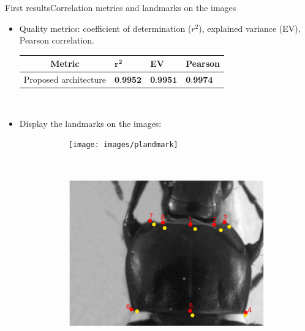 \documentclass[10pt,svgnames]{beamer}
\begin{document}
\begin{frame}{First results}{Correlation metrics and landmarks on the images}
	\begin{itemize}
		\item Quality metrics: coefficient of determination ($r^2$), explained variance (EV), Pearson correlation.
			\begin{table}[htbp]
				\centering
				\begin{tabular}{|c|p{1cm}|p{1cm}|p{1.5cm}|}
					\hline
					Metric & $\mathbf{r^{2}}$ & \textbf{EV} & \textbf{Pearson} \\ \hline
					Proposed architecture & $\textbf{0.9952}$ & $\textbf{0.9951}$ & $\textbf{0.9974}$ \\ \hline
				\end{tabular}
			\end{table}~\\
	\pause
	\item Display the landmarks on the images:
	\begin{figure}[htbp]
   				\begin{subfigure}[t]{0.5\textwidth}
        			\centering
        			\texttt{[image: images/plandmark]}
        			\caption{ }
        			\label{figsub11}
    			\end{subfigure}%
    			~ 
    			\begin{subfigure}[t]{0.5\textwidth}
        			\centering
        			\includegraphics[scale=.2]{images/plandmark2}
        			\caption{ }
        			\label{figsub22}
    			\end{subfigure} 
    		\end{figure}
   	\end{itemize}
\end{frame}
\end{document}
